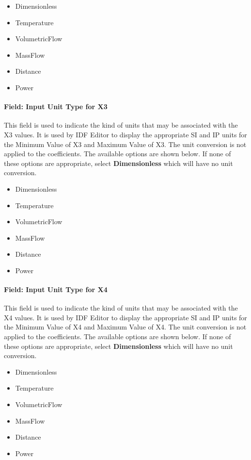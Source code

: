 \begin{itemize}
\item
  Dimensionless
\item
  Temperature
\item
  VolumetricFlow
\item
  MassFlow
\item
  Distance
\item
  Power
\end{itemize}

\paragraph{Field: Input Unit Type for X3}\label{field-input-unit-type-for-x3}

This field is used to indicate the kind of units that may be associated with the X3 values. It is used by IDF Editor to display the appropriate SI and IP units for the Minimum Value of X3 and Maximum Value of X3. The unit conversion is not applied to the coefficients. The available options are shown below. If none of these options are appropriate, select \textbf{Dimensionless} which will have no unit conversion.

\begin{itemize}
\item
  Dimensionless
\item
  Temperature
\item
  VolumetricFlow
\item
  MassFlow
\item
  Distance
\item
  Power
\end{itemize}

\paragraph{Field: Input Unit Type for X4}\label{field-input-unit-type-for-x4}

This field is used to indicate the kind of units that may be associated with the X4 values. It is used by IDF Editor to display the appropriate SI and IP units for the Minimum Value of X4 and Maximum Value of X4. The unit conversion is not applied to the coefficients. The available options are shown below. If none of these options are appropriate, select \textbf{Dimensionless} which will have no unit conversion.

\begin{itemize}
\item
  Dimensionless
\item
  Temperature
\item
  VolumetricFlow
\item
  MassFlow
\item
  Distance
\item
  Power
\end{itemize}

